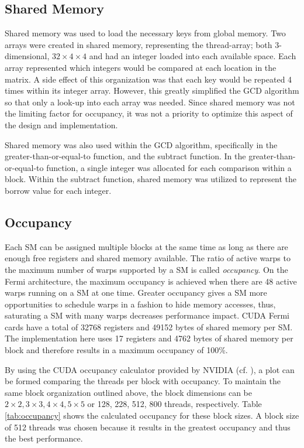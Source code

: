 \documentclass[12pt]{ucthesis}
\begin{document}
\subsection{Shared Memory}
Shared memory was used to load the necessary keys from global memory. Two 
arrays were created in shared memory, representing the thread-array; both 
3-dimensional, $32\times4\times4$ and had an integer loaded into each 
available space. Each array represented which integers would be compared at 
each location in the matrix. A side effect of this organization was that each key would be 
repeated 4 times within its integer array. However, this greatly simplified 
the GCD algorithm so that only a look-up into each array was needed. Since 
shared memory was not the limiting factor for occupancy, it was not a priority 
to optimize this aspect of the design and implementation. 

Shared memory was also used within the GCD algorithm, specifically in the 
greater-than-or-equal-to function, and the subtract function. In the 
greater-than-or-equal-to function, a single integer was allocated for each 
comparison within a block. Within the subtract function, shared memory was 
utilized to represent the borrow value for each integer. 

\subsection{Occupancy}
\label{sec:Occupancy}
Each SM can be assigned multiple blocks at the same time as long as there are 
enough free registers and shared memory available. The ratio of active warps 
to the maximum number of warps supported by a SM is called \emph{occupancy}. 
On the Fermi architecture, the maximum occupancy is achieved when there are 48 
active warps running on a SM at one time. Greater occupancy gives a SM more
opportunities to schedule warps in a fashion to hide memory accesses, thus,
saturating a SM with many warps decreases performance impact. CUDA Fermi cards
have a total of 32768 registers and 49152 bytes of shared memory per SM. The
implementation here uses 17 registers and 4762 bytes of shared memory per
block and therefore results in a maximum occupancy of 100\%.

By using the CUDA occupancy calculator provided by NVIDIA (cf. 
\cite{nvidia2012gpu}), a plot can be formed comparing the threads per block 
with occupancy. To maintain the same block organization outlined above, the 
block dimensions can be $2\times2, 3\times3, 4\times4, 5\times5$ or 128, 228, 
512, 800 threads, respectively. Table \ref{tab:occupancy} shows the calculated 
occupancy for these block sizes. A block size of 512 threads was chosen 
because it results in the greatest occupancy and thus the best performance. 
\end{document}
